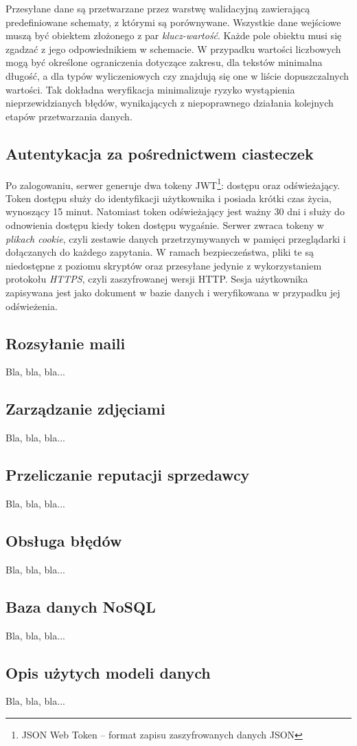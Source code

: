 Przesyłane dane są przetwarzane przez warstwę walidacyjną zawierającą predefiniowane schematy, z którymi są porównywane.
Wszystkie dane wejściowe muszą być obiektem złożonego z par \emph{klucz-wartość}.
Każde pole obiektu musi się zgadzać z jego odpowiednikiem w schemacie.
W przypadku wartości liczbowych mogą być określone ograniczenia dotyczące zakresu, dla tekstów minimalna długość, a dla typów wyliczeniowych czy znajdują się one w liście dopuszczalnych wartości.
Tak dokładna weryfikacja minimalizuje ryzyko wystąpienia nieprzewidzianych błędów, wynikających z niepoprawnego działania kolejnych etapów przetwarzania danych.

\subsection{Autentykacja za pośrednictwem ciasteczek}

Po zalogowaniu, serwer generuje dwa tokeny JWT\footnote{JSON Web Token -- format zapisu zaszyfrowanych danych JSON}: dostępu oraz odświeżający.
Token dostępu służy do identyfikacji użytkownika i posiada krótki czas życia, wynoszący 15 minut.
Natomiast token odświeżający jest ważny 30 dni i służy do odnowienia dostępu kiedy token dostępu wygaśnie.
Serwer zwraca tokeny w \emph{plikach cookie}, czyli zestawie danych przetrzymywanych w pamięci przeglądarki i dołączanych do każdego zapytania.
W ramach bezpieczeństwa, pliki te są niedostępne z poziomu skryptów oraz przesyłane jedynie z wykorzystaniem protokołu \emph{HTTPS}, czyli zaszyfrowanej wersji HTTP.
Sesja użytkownika zapisywana jest jako dokument w bazie danych i weryfikowana w przypadku jej odświeżenia.

\subsection{Rozsyłanie maili}

Bla, bla, bla...

\subsection{Zarządzanie zdjęciami}

Bla, bla, bla...

\subsection{Przeliczanie reputacji sprzedawcy}

Bla, bla, bla...

\subsection{Obsługa błędów}

Bla, bla, bla...

\subsection{Baza danych NoSQL}

Bla, bla, bla...

\subsection{Opis użytych modeli danych}

Bla, bla, bla...
